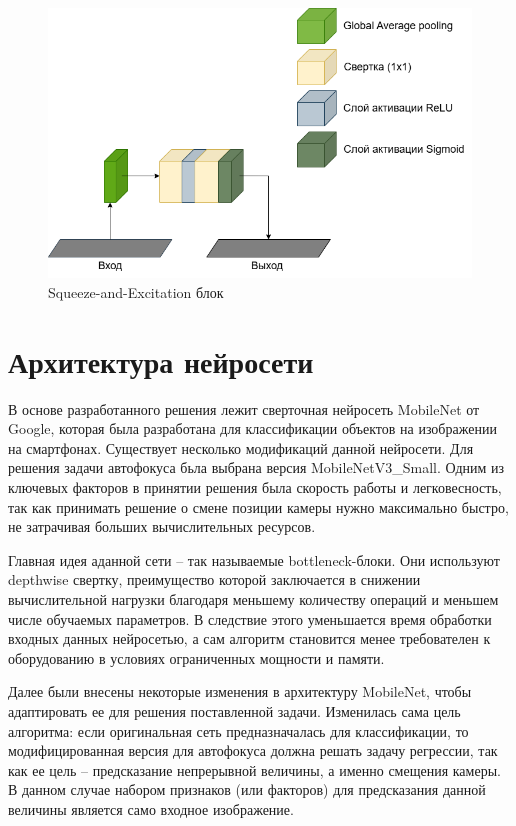 \begin{figure}[ht] 
	\center
	\includegraphics [scale=0.5] {my_folder/images/FocusNet-SE layer.png}
	\caption{Squeeze-and-Excitation блок}
	\label{fig:SE_block}
\end{figure}

\section{Архитектура нейросети}

В основе разработанного решения лежит сверточная нейросеть MobileNet от Google, которая была разработана для классификации объектов на изображении на смартфонах. Существует несколько модификаций данной нейросети. Для решения задачи автофокуса бьла выбрана версия MobileNetV3\_Small. Одним из ключевых факторов в принятии решения была скорость работы и легковесность, так как принимать решение о смене позиции камеры нужно максимально быстро, не затрачивая больших вычислительных ресурсов.

Главная идея аданной сети -- так называемые bottleneck-блоки. Они используют depthwise свертку, преимущество которой заключается в снижении вычислительной нагрузки благодаря меньшему количеству операций и меньшем числе обучаемых параметров. В следствие этого уменьшается время обработки входных данных нейросетью, а сам алгоритм становится менее требователен к оборудованию в условиях ограниченных мощности и памяти.

Далее были внесены некоторые изменения в архитектуру MobileNet, чтобы адаптировать ее для решения поставленной задачи. Изменилась сама цель алгоритма: если оригинальная сеть предназначалась для классификации, то модифицированная версия для автофокуса должна решать задачу регрессии, так как ее цель -- предсказание непрерывной величины, а именно смещения камеры. В данном случае набором признаков (или факторов) для предсказания данной величины является само входное изображение.

